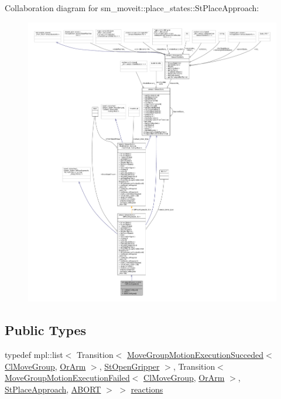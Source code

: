 Collaboration diagram for sm\+\_\+moveit\+:\+:place\+\_\+states\+:\+:St\+Place\+Approach\+:
\nopagebreak
\begin{figure}[H]
\begin{center}
\leavevmode
\includegraphics[width=350pt]{structsm__moveit_1_1place__states_1_1StPlaceApproach__coll__graph}
\end{center}
\end{figure}
\subsection*{Public Types}
\begin{DoxyCompactItemize}
\item 
typedef mpl\+::list$<$ Transition$<$ \hyperlink{structmove__group__interface__client_1_1MoveGroupMotionExecutionSucceded}{Move\+Group\+Motion\+Execution\+Succeded}$<$ \hyperlink{classmove__group__interface__client_1_1ClMoveGroup}{Cl\+Move\+Group}, \hyperlink{classsm__moveit_1_1OrArm}{Or\+Arm} $>$, \hyperlink{structsm__moveit_1_1place__states_1_1StOpenGripper}{St\+Open\+Gripper} $>$, Transition$<$ \hyperlink{structmove__group__interface__client_1_1MoveGroupMotionExecutionFailed}{Move\+Group\+Motion\+Execution\+Failed}$<$ \hyperlink{classmove__group__interface__client_1_1ClMoveGroup}{Cl\+Move\+Group}, \hyperlink{classsm__moveit_1_1OrArm}{Or\+Arm} $>$, \hyperlink{structsm__moveit_1_1place__states_1_1StPlaceApproach}{St\+Place\+Approach}, \hyperlink{classABORT}{A\+B\+O\+RT} $>$ $>$ \hyperlink{structsm__moveit_1_1place__states_1_1StPlaceApproach_a8532a592c622e84d25b282e727c1f475}{reactions}
\end{DoxyCompactItemize}
